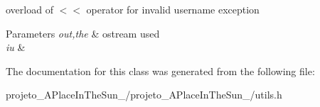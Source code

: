 overload of $<$$<$ operator for invalid username exception 


\begin{DoxyParams}{Parameters}
{\em out,the} & ostream used\\
\hline
{\em iu} & \\
\hline
\end{DoxyParams}


The documentation for this class was generated from the following file\+:\begin{DoxyCompactItemize}
\item 
projeto\+\_\+\+A\+Place\+In\+The\+Sun\+\_/projeto\+\_\+\+A\+Place\+In\+The\+Sun\+\_/utils.\+h\end{DoxyCompactItemize}
